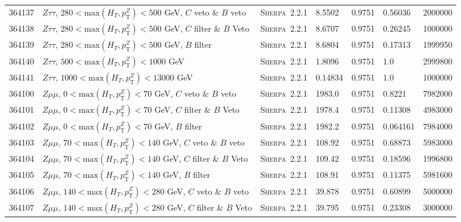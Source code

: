 \begin{table}[!htb]
{\begin{tabular}{llllllr}
      364137 & $Z \tau\tau $, $280<\text{max}(H_T,p_{\text{T}}^Z)<500$ GeV, $C$ veto \& $B$ veto & \textsc{Sherpa}~2.2.1 &  8.5502       &0.9751 & 0.56036  &   2000000\\       
      364138 & $Z \tau\tau $, $280<\text{max}(H_T,p_{\text{T}}^Z)<500$ GeV, $C$ filter \& $B$ Veto & \textsc{Sherpa}~2.2.1 &8.6707       &0.9751 & 0.26245  &  1000000 \\       
      364139 & $Z \tau\tau $, $280<\text{max}(H_T,p_{\text{T}}^Z)<500$ GeV, $B$ filter & \textsc{Sherpa}~2.2.1 &            8.6804       &0.9751 & 0.17313  &   1999950\\       
      364140 & $Z \tau\tau $, $500<\text{max}(H_T,p_{\text{T}}^Z)<1000$ GeV                      & \textsc{Sherpa}~2.2.1 &  1.8096       &0.9751 & 1.0 	   &   2999800\\ 
      364141 & $Z \tau\tau $, $1000<\text{max}(H_T,p_{\text{T}}^Z)<13000$ GeV                    & \textsc{Sherpa}~2.2.1 &  0.14834      &0.9751 & 1.0 	   &   1000000\\
      364100 & $Z \mu\mu $, $0<\text{max}(H_T,p_{\text{T}}^Z)<70$ GeV, $C$ veto \& $B$ veto & \textsc{Sherpa}~2.2.1 &       1983.0      & 0.9751& 0.8221  &  7982000\\
      364101 & $Z \mu\mu $, $0<\text{max}(H_T,p_{\text{T}}^Z)<70$ GeV, $C$ filter \& $B$ Veto & \textsc{Sherpa}~2.2.1 &     1978.4      & 0.9751& 0.11308 &  4983000\\
      364102 & $Z \mu\mu $, $0<\text{max}(H_T,p_{\text{T}}^Z)<70$ GeV, $B$ filter & \textsc{Sherpa}~2.2.1 &                 1982.2      & 0.9751& 0.064161&  7984000\\
      364103 & $Z \mu\mu $, $70<\text{max}(H_T,p_{\text{T}}^Z)<140$ GeV, $C$ veto \& $B$ veto & \textsc{Sherpa}~2.2.1 &     108.92      & 0.9751& 0.68873 &  5983000\\
      364104 & $Z \mu\mu $, $70<\text{max}(H_T,p_{\text{T}}^Z)<140$ GeV, $C$ filter \& $B$ Veto & \textsc{Sherpa}~2.2.1 &   109.42      & 0.9751& 0.18596 &  1996800\\
      364105 & $Z \mu\mu $, $70<\text{max}(H_T,p_{\text{T}}^Z)<140$ GeV, $B$ filter & \textsc{Sherpa}~2.2.1 &               108.91      & 0.9751& 0.11375 &  5981600\\
      364106 & $Z \mu\mu $, $140<\text{max}(H_T,p_{\text{T}}^Z)<280$ GeV, $C$ veto \& $B$ veto & \textsc{Sherpa}~2.2.1 &    39.878      & 0.9751& 0.60899 &  5000000\\
      364107 & $Z \mu\mu $, $140<\text{max}(H_T,p_{\text{T}}^Z)<280$ GeV, $C$ filter \& $B$ Veto & \textsc{Sherpa}~2.2.1 &  39.795      & 0.9751& 0.23308 &  3000000\\

\end{tabular}}
\end{table}
